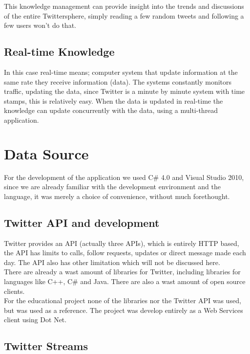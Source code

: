 \documentclass[]{article}  %
\begin{document}
This knowledge management can provide insight into the trends and discussions of the entire Twittersphere, simply reading a few random tweets and following a few users won't do that.

\subsection{Real-time Knowledge}

In this case real-time means; computer system that update information at the same rate they receive information (data). The systems constantly monitors traffic, updating the data, since Twitter is a minute by minute system with time stamps, this is relatively  easy. When the data is updated in real-time the knowledge can update concurrently with the data, using a multi-thread application.

\section{Data Source}

For the development of the application we used C\# 4.0 and Visual Studio 2010, since we are already familiar with the development environment and the language, it was merely a choice of convenience, without much forethought.

\subsection{Twitter API and development}

Twitter provides an API (actually three APIs), which is entirely HTTP based, the API has limits to calls, follow requests, updates or direct message made each day. The API also has other limitation which will not be discussed here. \\ There are already a wast amount of libraries for Twitter, including libraries for languages like C++, C\# and Java. There are also a wast amount of open source clients. \\ For the educational project none of the libraries nor the Twitter API was used, but was used as a reference. The project was develop entirely as a  Web Services client using Dot Net.

\subsection{Twitter Streams}
\end{document}
